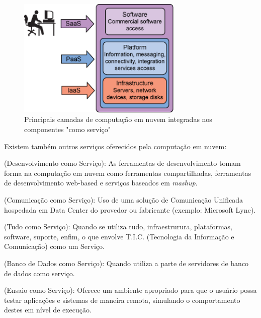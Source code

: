 \begin{figure}[H]
    \centering
    \includegraphics[width=0.7\textwidth]{img/layers.png}
    \caption{Principais camadas de computação em nuvem integradas nos componentes
        "como serviço"
    }
    \label{fig:layers}
\end{figure}


Existem também outros serviços oferecidos pela computação em nuvem:

\begin{itemise}

     (Desenvolvimento como Serviço): As
    ferramentas de desenvolvimento tomam forma na computação em nuvem como
    ferramentas compartilhadas, ferramentas de desenvolvimento web-based e serviços
    baseados em \emph{mashup}. 

     (Comunicação como Serviço): Uso de uma
    solução de Comunicação Unificada hospedada em Data Center do provedor ou
    fabricante (exemplo: Microsoft Lync). 

     (Tudo como Serviço): Quando se utiliza
    tudo, infraestrurura, plataformas, software, suporte, enfim, o que envolve
    T.I.C. (Tecnologia da Informação e Comunicação) como um Serviço. 

     (Banco de Dados como Serviço): Quando
    utiliza a parte de servidores de banco de dados como serviço.

      (Ensaio como Serviço): Oferece um ambiente
    apropriado para que o usuário possa testar aplicações e sistemas de maneira
    remota, simulando o comportamento destes em nível de execução.

\end{itemise}



